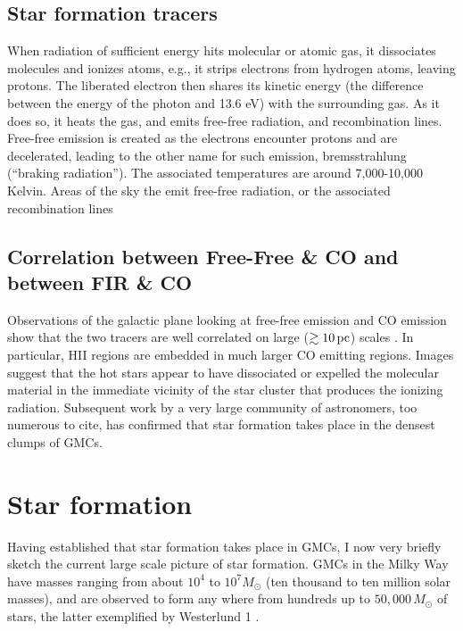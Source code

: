 \documentclass[../dissertation.tex]{subfiles}
\begin{document}
\subsection{Star formation tracers}

When radiation of sufficient energy hits molecular or atomic gas, it dissociates molecules and ionizes atoms, e.g.,  it strips electrons from hydrogen atoms, leaving protons.
The liberated electron then shares its kinetic energy (the difference between the energy of the photon and 13.6 eV) with the surrounding gas. 
As it does so, it heats the gas, and emits free-free radiation, and recombination lines. 
Free-free emission is created as the electrons encounter protons and are decelerated, leading to the other name for such emission, bremsstrahlung (``braking radiation''). 
The associated temperatures are around 7,000-10,000 Kelvin. Areas of the sky the emit free-free radiation, or the associated recombination lines


\subsection{Correlation between Free-Free \& CO and between FIR \& CO} \label{sec:Intro_FF_and_CO}

Observations of the galactic plane looking at free-free emission and CO emission show that the two tracers are well correlated on large ($\gtrsim 10 \,\rm pc$) scales \citep{1989ApJ...339..149S,1988ApJ...334L..51M}. In particular, HII regions are embedded in much larger CO emitting regions. Images suggest that the hot stars appear to have dissociated or expelled the molecular material in the immediate vicinity of the star cluster that produces the ionizing radiation.
Subsequent work by a very large community of astronomers, too numerous to cite, has confirmed that star formation takes place in the densest clumps of GMCs.


\section{Star formation}
Having established that star formation takes place in GMCs, I now very briefly sketch the current large scale picture of star formation.
GMCs in the Milky Way have masses ranging from about $10^4$ to $10^7M_\odot$ (ten thousand to ten million solar masses), 
and are observed to form any where from hundreds up to $50,000\,M_\odot$ of stars, the latter exemplified by Westerlund 1 \citep{2017A&A...602A..22A}. 
\end{document}
